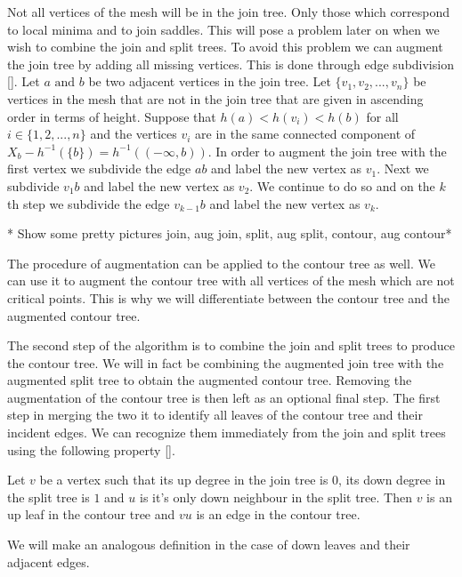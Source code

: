Not all vertices of the mesh will be in the join tree. Only those which correspond to local minima and to join saddles. This will pose a problem later on when we wish to combine the join and split trees. To avoid this problem we can augment the join tree by adding all missing vertices. This is done through edge subdivision []. Let $a \text{ and } b$ be two adjacent vertices in the join tree.  Let $\{v_1, v_2, ..., v_n\}$ be vertices in the mesh that are not in the join tree that are given in ascending order in terms of height.  Suppose that $h(a) < h(v_i) < h(b)$ for all $i \in \{1, 2, ..., n\}$ and the vertices $v_i$ are in the same connected component of $X_b - h^{-1}(\{b\}) = h^{-1}((-\infty, b))$. In order to augment the join tree with the first vertex we subdivide the edge $ab$ and label the new vertex as $v_1$. Next we subdivide $v_1b$ and label the new vertex as $v_2$. We continue to do so and on the $k$th step we subdivide the edge $v_{k-1}b$ and label the new vertex as $v_k$.

* Show some pretty pictures join, aug join, split, aug split, contour, aug contour*

The procedure of augmentation can be applied to the contour tree as well. We can use it to augment the contour tree with all vertices of the mesh which are not critical points. This is why we will differentiate between the contour tree and the augmented contour tree.

The second step of the algorithm is to combine the join and split trees to produce the contour tree. We will in fact be combining the augmented join tree with the augmented split tree to obtain the augmented contour tree. Removing the augmentation of the contour tree is then left as an optional final step. The first step in merging the two it to identify all leaves of the contour tree and their incident edges. We can recognize them immediately from the join and split trees using the following property [].

\begin{defn} Let $v$ be a vertex such that its up degree in the join tree is $0$, its down degree in the split tree is $1$ and $u$ is it's only down neighbour in the split tree. Then $v$ is an up leaf in the contour tree and $vu$ is an edge in the contour tree.  \end{defn}

We will make an analogous definition in the case of down leaves and their adjacent edges.


